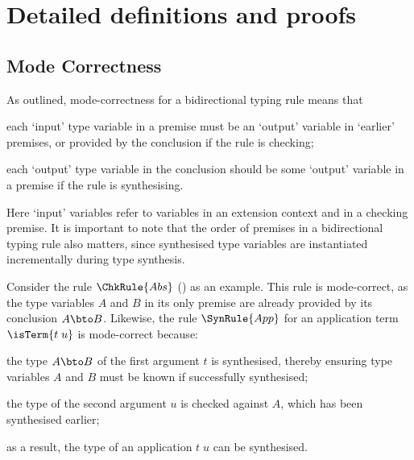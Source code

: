 
\section{Detailed definitions and proofs}\label{sec:defs-proofs}

\subsection{Mode Correctness}\label{sec:mode-correctness}
As \citet{Dunfield2021} outlined, mode-correctness for a bidirectional typing rule means that 
\begin{enumerate*}
\item each `input' type variable in a premise must be an `output' variable in `earlier' premises, or provided by the conclusion if the rule is checking;
\item each `output' type variable in the conclusion should be some `output' variable in a premise if the rule is synthesising.
\end{enumerate*}
Here `input' variables refer to variables in an extension context and in a checking premise.
It is important to note that the order of premises in a bidirectional typing rule also matters, since synthesised type variables are instantiated incrementally during type synthesis.

Consider the rule $\ChkRule{Abs}$ () as an example.
This rule is mode-correct, as the type variables $A$ and $B$ in its only premise are already provided by its conclusion $A \bto B$.
Likewise, the rule $\SynRule{App}$ for an application term $\isTerm{t\;u}$ is mode-correct because:
\begin{enumerate*}
\item the type $A \bto B$ of the first argument $t$ is synthesised, thereby ensuring type variables $A$ and $B$ must be known if successfully synthesised;
\item the type of the second argument $u$ is checked against $A$, which has been synthesised earlier;
\item as a result, the type of an application $t\;u$ can be synthesised.
\end{enumerate*}

